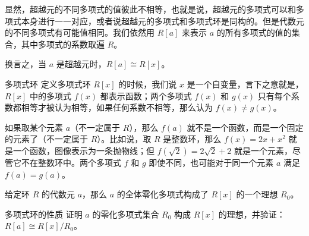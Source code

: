 显然，超越元的不同多项式的值彼此不相等，也就是说，超越元的多项式可以和多项式本身进行一一对应，或者说超越元的多项式和多项式环是同构的。但是代数元的不同多项式有可能值相同。我们依然用 $R[a]$ 来表示 $a$ 的所有多项式的值的集合，其中多项式的系数取遍 $R$。

换言之，当 $a$ 是超越元时，$R[a]\cong R[x]$。

\begin{example}{多项式环}
定义多项式环 $R[x]$ 的时候，我们说 $x$ 是一个自变量，言下之意就是，$R[x]$ 中的多项式 $f(x)$ 都表示函数；两个多项式 $f(x)$ 和 $g(x)$ 只有每个系数都相等才被认为相等，如果任何系数不相等，那么认为 $f(x)\not=g(x)$。

如果取某个元素 $a$（不一定属于 $R$），那么 $f(a)$ 就不是一个函数，而是一个固定的元素了（不一定属于 $R$）。比如说，取 $R$ 是整数环，那么 $f(x)=2x+x^2$ 就是一个函数，图像表示为一条抛物线；但 $f(\sqrt{2})=2\sqrt{2}+2$ 就是一个元素，尽管它不在整数环中。两个多项式 $f$ 和 $g$ 即使不同，也可能对于同一个元素 $a$ 满足 $f(a)=g(a)$。

给定环 $R$ 的代数元 $a$，那么 $a$ 的全体零化多项式构成了 $R[x]$ 的一个理想 $R_0$。


\end{example}

\begin{exercise}{多项式环的性质}
证明 $a$ 的零化多项式集合 $R_0$ 构成 $R[x]$ 的理想，并验证：$R[a]\cong R[x]/R_0$。
\end{exercise}










